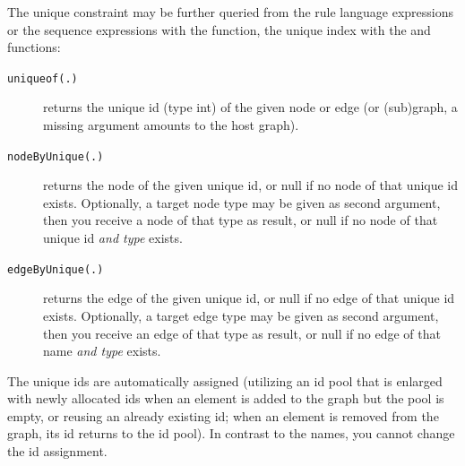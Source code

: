 The unique constraint may be further queried from the rule language expressions or the sequence expressions with the \texttt{} function,
the unique index with the \texttt{} and \texttt{} functions:
\begin{description}
\item[\texttt{uniqueof(.)}] returns the unique id (type int) of the given node or edge (or (sub)graph, a missing argument amounts to the host graph).
\item[\texttt{nodeByUnique(.)}] returns the node of the given unique id, or null if no node of that unique id exists. Optionally, a target node type may be given as second argument, then you receive a node of that type as result, or null if no node of that unique id \emph{and type} exists.
\item[\texttt{edgeByUnique(.)}] returns the edge of the given unique id, or null if no edge of that unique id exists. Optionally, a target edge type may be given as second argument, then you receive an edge of that type as result, or null if no edge of that name \emph{and type} exists.
\end{description}

The unique ids are automatically assigned (utilizing an id pool that is enlarged with newly allocated ids when an element is added to the graph but the pool is empty, or reusing an already existing id; when an element is removed from the graph, its id returns to the id pool).
In contrast to the names, you cannot change the id assignment.

